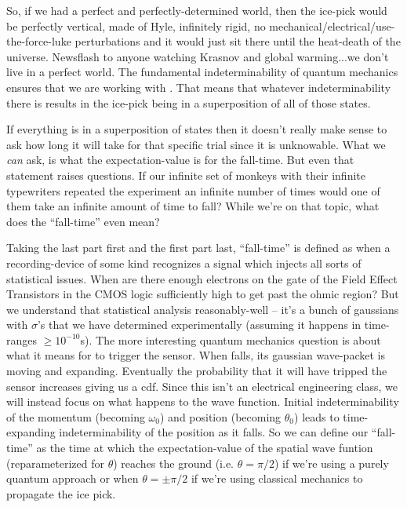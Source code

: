 \begin{answer}
  So, if we had a perfect and perfectly-determined world, then the
  ice-pick would be perfectly vertical, made of Hyle, infinitely
  rigid, no mechanical/electrical/use-the-force-luke perturbations and
  it would just sit there until the heat-death of the universe.
  Newsflash to anyone watching Krasnov and global warming...we don't
  live in a perfect world.  The fundamental indeterminability of
  quantum mechanics ensures that we are working with \icepick{}.  That
  means that whatever indeterminability there is results in the
  ice-pick being in a superposition of all of those states.

  If everything is in a superposition of states then it doesn't really
  make sense to ask how long it will take for that specific trial
  since it is unknowable.  What we \emph{can} ask, is what the
  expectation-value is for the fall-time.  But even that statement
  raises questions.  If our infinite set of monkeys with their
  infinite typewriters repeated the experiment an infinite number of
  times would one of them take an infinite amount of time to fall?
  While we're on that topic, what does the ``fall-time'' even mean?

  Taking the last part first and the first part last, ``fall-time'' is
  defined as when a recording-device of some kind recognizes a signal
  which injects all sorts of statistical issues.  When are there
  enough electrons on the gate of the Field Effect Transistors in the
  CMOS logic sufficiently high to get past the ohmic region?  But we
  understand that statistical analysis reasonably-well -- it's a bunch
  of gaussians with $\sigma$'s that we have determined experimentally
  (assuming it happens in time-ranges $\ge 10^{-10}$s).  The more
  interesting quantum mechanics question is about what it means for
  \icepick{} to trigger the sensor.  When \icepick{} falls, its
  gaussian wave-packet is moving and expanding.  Eventually the
  probability that it will have tripped the sensor increases giving us
  a \ac{cdf}.  Since this isn't an electrical engineering class, we
  will instead focus on what happens to the wave function.  Initial
  indeterminability of the momentum (becoming $\omega_0$) and position
  (becoming $\theta_0$) leads to time-expanding indeterminability of
  the position as it falls.  So we can define our ``fall-time'' as the
  time at which the expectation-value of the spatial wave funtion
  (reparameterized for $\theta$) reaches the ground (i.e. $\theta =
  \pi/2$) if we're using a purely quantum approach or when $\theta =
  \pm \pi/2$ if we're using classical mechanics to propagate the ice
  pick.


\end{answer}
